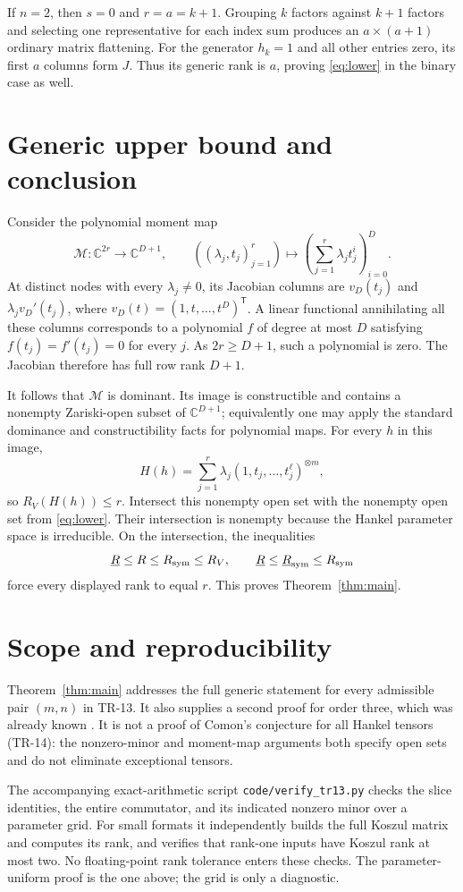 \documentclass[11pt]{article}
\newcommand{\C}{\mathbb C}
\newcommand{\brk}{\underline{R}}
\begin{document}
If $n=2$, then $s=0$ and $r=a=k+1$. Grouping $k$ factors against $k+1$
factors and selecting one representative for each index sum produces
an $a\times(a+1)$ ordinary matrix flattening. For the generator $h_k=1$
and all other entries zero, its first $a$ columns form $J$. Thus its
generic rank is $a$, proving \eqref{eq:lower} in the binary case as well.

\section{Generic upper bound and conclusion}
Consider the polynomial moment map
\[
 \mathcal M:\C^{2r}\longrightarrow\C^{D+1},\qquad
 ((\lambda_j,t_j)_{j=1}^{r})\longmapsto
 \left(\sum_{j=1}^{r}\lambda_jt_j^i\right)_{i=0}^{D}.
\]
At distinct nodes with every $\lambda_j\ne0$, its Jacobian columns are
$v_D(t_j)$ and $\lambda_jv_D'(t_j)$, where
$v_D(t)=(1,t,\ldots,t^D)^{\mathsf T}$.
A linear functional annihilating all these columns corresponds to a
polynomial $f$ of degree at most $D$ satisfying
$f(t_j)=f'(t_j)=0$ for every $j$.
As $2r\ge D+1$, such a polynomial is zero. The Jacobian therefore has
full row rank $D+1$.

It follows that $\mathcal M$ is dominant. Its image is constructible and
contains a nonempty Zariski-open subset of $\C^{D+1}$; equivalently one
may apply the standard dominance and constructibility facts for
polynomial maps. For every $h$ in this image,
\[
 H(h)=\sum_{j=1}^{r}\lambda_j
       (1,t_j,\ldots,t_j^{\ell})^{\otimes m},
\]
so $R_V(H(h))\le r$.
Intersect this nonempty open set with the nonempty open set from
\eqref{eq:lower}. Their intersection is nonempty because the Hankel
parameter space is irreducible. On the intersection, the inequalities
\[
 \brk\le R\le R_{\rm sym}\le R_V,
 \qquad
 \brk\le\brk_{\rm sym}\le R_{\rm sym}
\]
force every displayed rank to equal $r$. This proves
Theorem~\ref{thm:main}.

\section{Scope and reproducibility}
Theorem~\ref{thm:main} addresses the full generic statement for every
admissible pair $(m,n)$ in TR-13. It also supplies a second proof for
order three, which was already known \cite{NY}. It is not a proof of
Comon's conjecture for all Hankel tensors (TR-14): the nonzero-minor and
moment-map arguments both specify open sets and do not eliminate
exceptional tensors.

The accompanying exact-arithmetic script \texttt{code/verify\_tr13.py}
checks the slice identities, the entire commutator, and its indicated
nonzero minor over a parameter grid. For small formats it independently
builds the full Koszul matrix and computes its rank, and verifies that
rank-one inputs have Koszul rank at most two. No floating-point rank
tolerance enters these checks. The parameter-uniform proof is the one
above; the grid is only a diagnostic.
\end{document}
